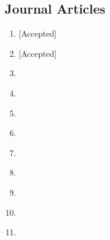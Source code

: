 \documentclass{my_cv}%
\begin{document}
\subsection{\faFileTextO \hspace{0.5em}\bfseries Journal Articles}
\vspace{1em}
\begin{enumerate}
\setlength\itemsep{-0.1em}
\color{mygray}
 \item {} [Accepted] \cite{Dhruv2021}
 \item {} [Accepted] \cite{Surendra2020}
 \item {} \cite{Sreedhar2020}
 \item {} \cite{Saini2020}
 \item {} \cite{puthiyaveettil2020}
 \item {} \cite{Nithin2019}
 \item {} \cite{maierhofer2018}
 \item {} \cite{unnikrishnakurup2017}
 \item {} \cite{thomas2017}
 \item {} \cite{sreedhar2016}
 \item {} \cite{sreedhar2012}
\end{enumerate}

\end{document}
